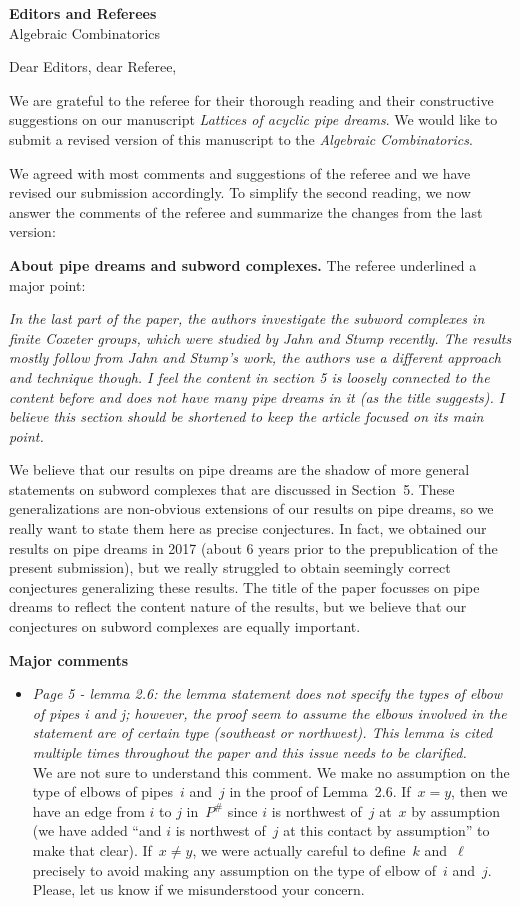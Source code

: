 \documentclass{letter}
\begin{document}
\begin{letter}{{\bf Editors and Referees} \\ Algebraic Combinatorics}
\opening{Dear Editors, dear Referee,}

We are grateful to the referee for their thorough reading and their constructive suggestions on our manuscript \emph{Lattices of acyclic pipe dreams}. We would like to submit a revised version of this manuscript to the \emph{Algebraic Combinatorics}. 

We agreed with most comments and suggestions of the referee and we have revised our submission accordingly. To simplify the second reading, we now answer the comments of the referee and summarize the changes from the last version:

{\bf About pipe dreams and subword complexes.} The referee underlined a major point:

\textsl{\color{gray} 
In the last part of the paper, the authors investigate the subword complexes in finite Coxeter groups, which were studied by Jahn and Stump recently. The results mostly follow from Jahn and Stump's work, the authors use a different approach and technique though. I feel the content in section 5 is loosely connected to the content before and does not have many pipe dreams in it (as the title suggests). I believe this section should be shortened to keep the article focused on its main point.
}

We believe that our results on pipe dreams are the shadow of more general statements on subword complexes that are discussed in Section~5.
These generalizations are non-obvious extensions of our results on pipe dreams, so we really want to state them here as precise conjectures.
In fact, we obtained our results on pipe dreams in 2017 (about 6 years prior to the prepublication of the present submission), but we really struggled to obtain seemingly correct conjectures generalizing these results.
The title of the paper focusses on pipe dreams to reflect the content nature of the results, but we believe that our conjectures on subword complexes are equally important.

{\bf Major comments}

\begin{itemize}
\item \textsl{\color{gray} Page 5 - lemma 2.6: the lemma statement does not specify the types of elbow of pipes i and j; however, the proof seem to assume the elbows involved in the statement are of certain type (southeast or northwest). This lemma is cited multiple times throughout the paper and this issue needs to be clarified.} \\
We are not sure to understand this comment.
We make no assumption on the type of elbows of pipes~$i$ and~$j$ in the proof of Lemma~2.6.
If~$x=y$, then we have an edge from $i$ to $j$ in~$P^\#$ since $i$ is northwest of~$j$ at~$x$ by assumption (we have added ``and $i$ is northwest of~$j$ at this contact by assumption'' to make that clear).
If~$x \ne y$, we were actually careful to define~$k$ and~$\ell$ precisely to avoid making any assumption on the type of elbow of~$i$ and~$j$.
Please, let us know if we misunderstood your concern.


\end{itemize}
\end{letter}
\end{document}
